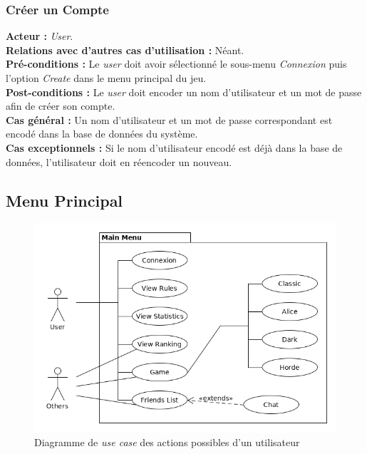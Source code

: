 \documentclass[10pt, a4paper]{article}
\begin{document}
\subsubsection{Créer un Compte}
\textbf{Acteur :} \textit{User}.\\
\textbf{Relations avec d'autres cas d'utilisation :} Néant.\\
\textbf{Pré-conditions :} Le \textit{user} doit avoir sélectionné le sous-menu \textit{Connexion} puis l'option {\itshape Create} dans le menu principal du jeu.\\
\textbf{Post-conditions :} Le \textit{user} doit encoder un nom d'utilisateur et un mot de passe afin de créer son compte.\\
\textbf{Cas général :} Un nom d'utilisateur et un mot de passe correspondant est encodé dans la base de données du système.\\
\textbf{Cas exceptionnels :} Si le nom d'utilisateur encodé est déjà dans la base de données, l'utilisateur doit en réencoder un nouveau.



\subsection{Menu Principal}

\begin{figure}[ht]
\begin{center}
\includegraphics[scale=0.5]{UC_mainmenu.png}
\caption{Diagramme de \textit{use case} des actions possibles d'un utilisateur}
\label{UC_menu} %
\end{center}
\end{figure}
\end{document}

